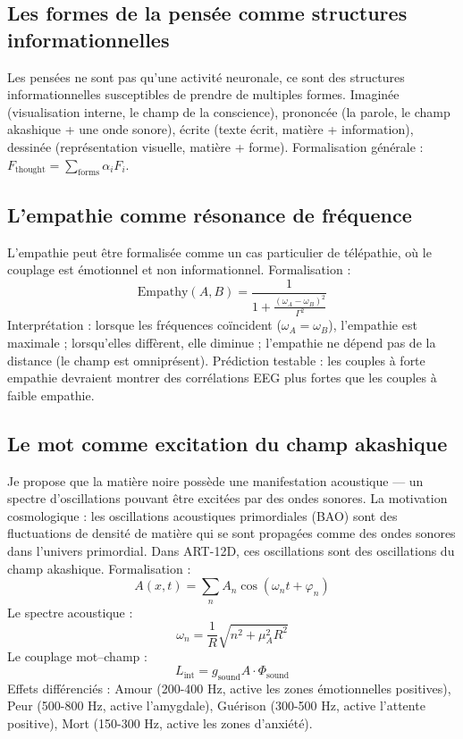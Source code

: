 \subsection{Les formes de la pensée comme structures informationnelles}
Les pensées ne sont pas qu'une activité neuronale, ce sont des structures informationnelles susceptibles de prendre de multiples formes. Imaginée (visualisation interne, le champ de la conscience), prononcée (la parole, le champ akashique + une onde sonore), écrite (texte écrit, matière + information), dessinée (représentation visuelle, matière + forme). Formalisation générale : $F_{\text{thought}} = \sum_{\text{forms}} \alpha_i F_i$.

\subsection{L'empathie comme résonance de fréquence}
L'empathie peut être formalisée comme un cas particulier de télépathie, où le couplage est émotionnel et non informationnel. Formalisation :
\begin{equation}
\text{Empathy}(A,B) = \frac{1}{1 + \frac{(\omega_A - \omega_B)^2}{\Gamma^2}}
\end{equation}
Interprétation : lorsque les fréquences coïncident ($\omega_A = \omega_B$), l'empathie est maximale ; lorsqu'elles diffèrent, elle diminue ; l'empathie ne dépend pas de la distance (le champ est omniprésent). Prédiction testable : les couples à forte empathie devraient montrer des corrélations EEG plus fortes que les couples à faible empathie.

\subsection{Le mot comme excitation du champ akashique}
Je propose que la matière noire possède une manifestation acoustique --- un spectre d'oscillations pouvant être excitées par des ondes sonores. La motivation cosmologique : les oscillations acoustiques primordiales (BAO) sont des fluctuations de densité de matière qui se sont propagées comme des ondes sonores dans l'univers primordial. Dans ART-12D, ces oscillations sont des oscillations du champ akashique. Formalisation :
\begin{equation}
A(x,t) = \sum_n A_n \cos(\omega_n t + \varphi_n)
\end{equation}
Le spectre acoustique :
\begin{equation}
\omega_n = \frac{1}{R} \sqrt{n^2 + \mu_A^2 R^2}
\end{equation}
Le couplage mot--champ :
\begin{equation}
L_{\text{int}} = g_{\text{sound}} A \cdot \Phi_{\text{sound}}
\end{equation}
Effets différenciés : Amour (200-400 Hz, active les zones émotionnelles positives), Peur (500-800 Hz, active l'amygdale), Guérison (300-500 Hz, active l'attente positive), Mort (150-300 Hz, active les zones d'anxiété).


